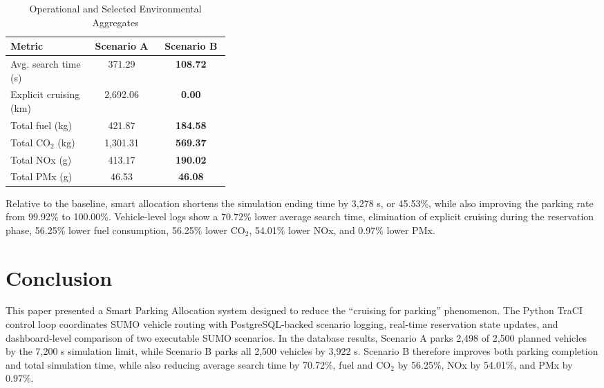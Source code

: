 \documentclass[conference]{IEEEtran}
\begin{document}
\begin{table}[htbp]
    \caption{Operational and Selected Environmental Aggregates}
    \label{tab:vehicle_metrics}
    \centering
    \footnotesize
    \begin{tabular}{|p{0.37\linewidth}|c|c|}
        \hline
        \textbf{Metric} & \textbf{Scenario A} & \textbf{Scenario B} \\
        \hline
        Avg. search time (s) & 371.29 & \textbf{108.72} \\
        Explicit cruising (km) & 2,692.06 & \textbf{0.00} \\
        Total fuel (kg) & 421.87 & \textbf{184.58} \\
        Total CO$_2$ (kg) & 1,301.31 & \textbf{569.37} \\
        Total NOx (g) & 413.17 & \textbf{190.02} \\
        Total PMx (g) & 46.53 & \textbf{46.08} \\
        \hline
    \end{tabular}
\end{table}

Relative to the baseline, smart allocation shortens the simulation ending time by 3,278 s, or 45.53\%, while also improving the parking rate from 99.92\% to 100.00\%. Vehicle-level logs show a 70.72\% lower average search time, elimination of explicit cruising during the reservation phase, 56.25\% lower fuel consumption, 56.25\% lower CO$_2$, 54.01\% lower NOx, and 0.97\% lower PMx.

\section{Conclusion}
This paper presented a Smart Parking Allocation system designed to reduce the ``cruising for parking'' phenomenon. The Python TraCI control loop coordinates SUMO vehicle routing with PostgreSQL-backed scenario logging, real-time reservation state updates, and dashboard-level comparison of two executable SUMO scenarios. In the database results, Scenario A parks 2,498 of 2,500 planned vehicles by the 7,200 s simulation limit, while Scenario B parks all 2,500 vehicles by 3,922 s. Scenario B therefore improves both parking completion and total simulation time, while also reducing average search time by 70.72\%, fuel and CO$_2$ by 56.25\%, NOx by 54.01\%, and PMx by 0.97\%.
\end{document}
